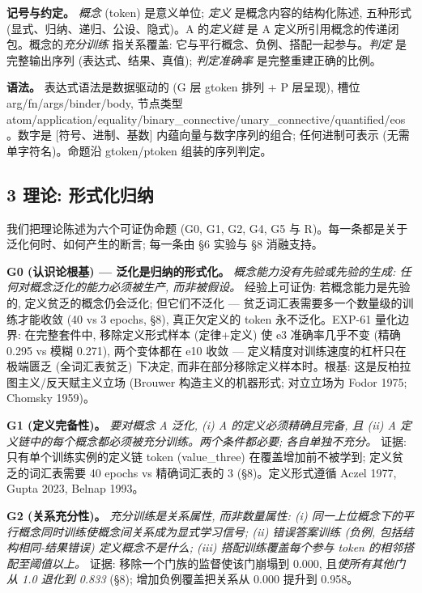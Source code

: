 \documentclass[
]{article}
\begin{document}
\textbf{记号与约定。} \emph{概念} (token) 是意义单位; \emph{定义}
是概念内容的结构化陈述, 五种形式 (显式、归纳、递归、公设、隐式)。A
的\emph{定义链} 是 A 定义所引用概念的传递闭包。概念的\emph{充分训练}
指关系覆盖: 它与平行概念、负例、搭配一起参与。\emph{判定} 是完整输出序列
(表达式、结果、真值); \emph{判定准确率} 是完整重建正确的比例。

\textbf{语法。} 表达式语法是数据驱动的 (G 层 gtoken 排列 + P 层呈现),
槽位 arg/fn/args/binder/body, 节点类型
atom/application/equality/binary\_connective/unary\_connective/quantified/eos。数字是
{[}符号、进制、基数{]} 内蕴向量与数字序列的组合; 任何进制可表示
(无需单字符名)。命题沿 gtoken/ptoken 组装的序列判定。

\subsection{3 理论:
形式化归纳}\label{ux7406ux8bba-ux5f62ux5f0fux5316ux5f52ux7eb3}

我们把理论陈述为六个可证伪命题 (G0, G1, G2, G4, G5 与
R)。每一条都是关于泛化何时、如何产生的断言; 每一条由 §6 实验与 §8
消融支持。

\textbf{G0 (认识论根基) --- 泛化是归纳的形式化。}
\emph{概念能力没有先验或先验的生成: 任何对概念泛化的能力必须被生产,
而非被假设。} 经验上可证伪: 若概念能力是先验的, 定义贫乏的概念仍会泛化;
但它们不泛化 --- 贫乏词汇表需要多一个数量级的训练才能收敛 (40 vs 3
epochs, §8), 真正欠定义的 token 永不泛化。EXP-61 量化边界: 在完整套件中,
移除定义形式样本 (定律+定义) 使 e3 准确率几乎不变 (精确 0.295 vs 模糊
0.271), 两个变体都在 e10 收敛 --- 定义精度对训练速度的杠杆只在极端匮乏
(全词汇表贫乏) 下决定, 而非在部分移除定义样本时。根基:
这是反柏拉图主义/反天赋主义立场 (Brouwer 构造主义的机器形式; 对立立场为
Fodor 1975; Chomsky 1959)。

\textbf{G1 (定义完备性)。} \emph{要对概念 A 泛化, (i) A
的定义必须精确且完备, 且 (ii) A
定义链中的每个概念都必须被充分训练。两个条件都必要; 各自单独不充分。}
证据: 只有单个训练实例的定义链 token (value\_three)
在覆盖增加前不被学到; 定义贫乏的词汇表需要 40 epochs vs 精确词汇表的 3
(§8)。定义形式遵循 Aczel 1977, Gupta 2023, Belnap 1993。

\textbf{G2 (关系充分性)。} \emph{充分训练是关系属性, 而非数量属性: (i)
同一上位概念下的平行概念同时训练使概念间关系成为显式学习信号; (ii)
错误答案训练 (负例, 包括结构相同-结果错误) 定义概念不是什么; (iii)
搭配训练覆盖每个参与 token 的相邻搭配至阈值以上。} 证据:
移除一个门族的监督使该门崩塌到 0.000, 且\emph{使所有其他门从 1.0 退化到
0.833} (§8); 增加负例覆盖把关系从 0.000 提升到 0.958。
\end{document}
